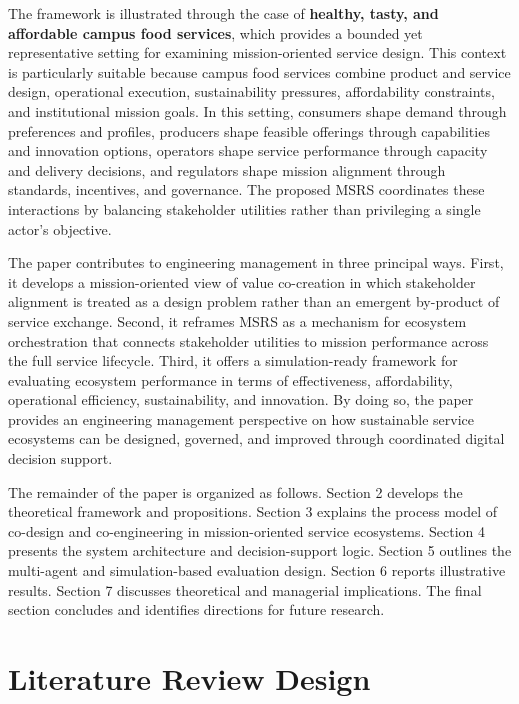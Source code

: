 \documentclass[
  letterpaper,
  DIV=11,
  numbers=noendperiod]{scrartcl}
\begin{document}
The framework is illustrated through the case of \textbf{healthy, tasty,
and affordable campus food services}, which provides a bounded yet
representative setting for examining mission-oriented service design.
This context is particularly suitable because campus food services
combine product and service design, operational execution,
sustainability pressures, affordability constraints, and institutional
mission goals. In this setting, consumers shape demand through
preferences and profiles, producers shape feasible offerings through
capabilities and innovation options, operators shape service performance
through capacity and delivery decisions, and regulators shape mission
alignment through standards, incentives, and governance. The proposed
MSRS coordinates these interactions by balancing stakeholder utilities
rather than privileging a single actor's objective.

The paper contributes to engineering management in three principal ways.
First, it develops a mission-oriented view of value co-creation in which
stakeholder alignment is treated as a design problem rather than an
emergent by-product of service exchange. Second, it reframes MSRS as a
mechanism for ecosystem orchestration that connects stakeholder
utilities to mission performance across the full service lifecycle.
Third, it offers a simulation-ready framework for evaluating ecosystem
performance in terms of effectiveness, affordability, operational
efficiency, sustainability, and innovation. By doing so, the paper
provides an engineering management perspective on how sustainable
service ecosystems can be designed, governed, and improved through
coordinated digital decision support.

The remainder of the paper is organized as follows. Section 2 develops
the theoretical framework and propositions. Section 3 explains the
process model of co-design and co-engineering in mission-oriented
service ecosystems. Section 4 presents the system architecture and
decision-support logic. Section 5 outlines the multi-agent and
simulation-based evaluation design. Section 6 reports illustrative
results. Section 7 discusses theoretical and managerial implications.
The final section concludes and identifies directions for future
research.

\section{Literature Review Design}\label{literature-review-design}
\end{document}
